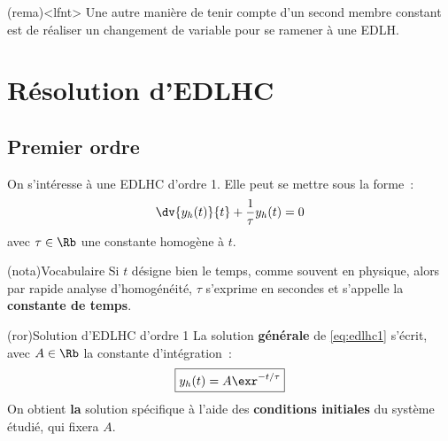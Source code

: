 \documentclass[a4paper, 12pt, garamond]{book}
\begin{document}
\begin{tcb}(rema)<lfnt>{}
	Une autre manière de tenir compte d'un second membre constant est de réaliser
	un changement de variable pour se ramener à une EDLH.
\end{tcb}

\section{Résolution d'EDLHC}
\subsection{Premier ordre}
On s'intéresse à une EDLHC d'ordre 1. Elle peut se mettre sous la forme~:
\begin{equation}
	\dv{y_h(t)}{t} + \frac{1}{\tau} y_h(t) = 0
	\label{eq:edlhc1}
\end{equation}
avec $\tau \in \Rb$ une constante homogène à $t$.
\begin{tcb}(nota){Vocabulaire}
	Si $t$ désigne bien le temps, comme souvent en physique, alors par rapide
	analyse d'homogénéité, $\tau$ s'exprime en secondes et s'appelle la
	\textbf{constante de temps}.
\end{tcb}

\begin{tcb}(ror){Solution d'EDLHC d'ordre 1}
	La solution \textbf{générale} de \eqref{eq:edlhc1} s'écrit, avec $A \in \Rb$
	la constante d'intégration~:
	\[
		\boxed{y_h(t) = A\exr^{-t/\tau}}
	\]
	On obtient \textbf{la} solution spécifique à l'aide des \textbf{conditions
		initiales} du système étudié, qui fixera $A$.
\end{tcb}
\end{document}
